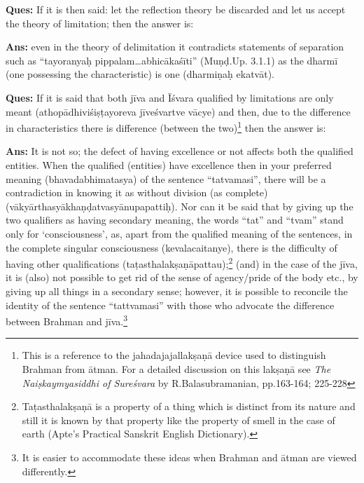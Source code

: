

\textbf{Ques:} If it is then said: let the reflection theory be discarded and let us accept the theory of limitation; then the answer is: 

\textbf{Ans:} even in the theory of delimitation it contradicts statements of separation such as “tayoranyaḥ pippalam…abhicākaśīti” (Muṇḍ.Up. 3.1.1) as the dharmī (one possessing the characteristic) is one (dharmiṇaḥ ekatvāt). 

\eject

\textbf{Ques:} If it is said that both jīva and Īśvara qualified by limitations are only meant (athopādhiviśiṣṭayoreva jīveśvartve vācye)  and then, due to the difference in characteristics  there is difference (between the two)\footnote{This is a reference to the jahadajajallakṣaṇā device used to distinguish Brahman from ātman. For a detailed discussion on this lakṣaṇā see \textit{The Naiṣkaymyasiddhi of Sureśvara} by R.Balasubramanian, pp.163-164; 225-228} then the answer is:

\textbf{Ans:} It is not so; the defect of having excellence or not affects both the qualified entities.  When the qualified (entities) have excellence then in your preferred meaning (bhavadabhimatasya) of the sentence “tatvamasi”, there will be a contradiction in knowing it as without division (as complete) (vākyārthasyākhaṇḍatvasyānupapattiḥ). Nor can it be said that by giving up the two qualifiers as having secondary meaning, the words “tat” and “tvam” stand only for ‘consciousness’, as, apart from the qualified meaning of the sentences, in the complete singular consciousness (kevalacaitanye), there is the difficulty of having other qualifications (taṭasthalakṣaṇāpattau);\footnote{Taṭasthalakṣaṇā is a property of a thing which is distinct from its nature and still it is known by that property like the property of smell in the case of earth (Apte’s Practical Sanskrit English Dictionary).} (and) in the case of the jīva, it is (also) not possible to get rid of the sense of agency/pride of the body etc., by giving up all things in a secondary sense;  however, it is possible to reconcile the identity of the sentence “tattvamasi” with those who advocate the difference between Brahman and jīva.\footnote{It is easier to accommodate these ideas when Brahman and ātman are viewed differently.} 

